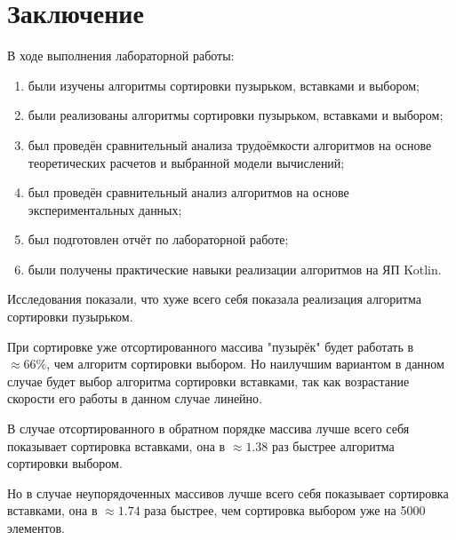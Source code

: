 \documentclass[12pt]{report}
\begin{document}
\chapter*{Заключение}
В ходе выполнения лабораторной работы:
\begin{enumerate}
\item были изучены алгоритмы сортировки пузырьком, вставками и выбором;
\item были реализованы алгоритмы сортировки пузырьком, вставками и выбором;
\item был проведён сравнительный анализа трудоёмкости алгоритмов на основе теоретических расчетов и выбранной модели вычислений;
\item был проведён сравнительный анализ алгоритмов на основе экспериментальных данных;
\item был подготовлен отчёт по лабораторной работе;
\item были получены практические навыки реализации алгоритмов на ЯП Kotlin.
\end{enumerate}

Исследования показали, что хуже всего себя показала реализация алгоритма сортировки пузырьком.

При сортировке уже отсортированного массива "пузырёк" будет работать в $\approx 66\%$, чем алгоритм сортировки выбором. Но наилучшим вариантом в данном случае будет выбор алгоритма сортировки вставками, так как возрастание скорости его работы в данном случае линейно.

В случае отсортированного в обратном порядке массива лучше всего себя показывает сортировка вставками, она в $\approx 1.38$ раз быстрее алгоритма сортировки выбором.

Но в случае неупорядоченных массивов лучше всего себя показывает сортировка вставками, она в $\approx 1.74$ раза быстрее, чем сортировка выбором уже на 5000 элементов. 

\end{document}

